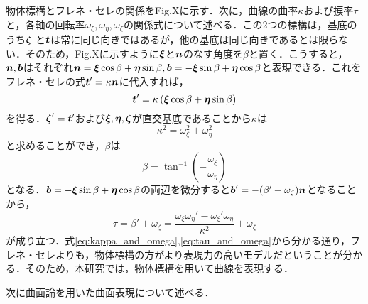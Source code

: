  	
 	物体標構とフレネ・セレの関係をFig.Xに示す．次に，曲線の曲率$ \kappa $および捩率$ \tau $と，各軸の回転率$ \omega_{\xi},\omega_{\eta},\omega_{\zeta} $の関係式について述べる．この2つの標構は，基底のうち$ \boldsymbol{\zeta}$ と$\boldsymbol{t} $は常に同じ向きではあるが，他の基底は同じ向きであるとは限らない．そのため，Fig.Xに示すように$ \boldsymbol{\xi} $と$ \boldsymbol{n} $のなす角度を$ \beta $と置く．こうすると，$ \boldsymbol{n},\boldsymbol{b}$はそれぞれ$ \boldsymbol{n} = \boldsymbol{\xi} \cos \beta + \boldsymbol{\eta} \sin \beta,\boldsymbol{b} = -\boldsymbol{\xi} \sin \beta + \boldsymbol{\eta} \cos \beta $と表現できる．これをフレネ・セレの式$ \boldsymbol{t}' = \kappa \boldsymbol{n} $に代入すれば，
 	\begin{equation}\label{eq:t_dot_eq}
 		\boldsymbol{t}' = \kappa \left( \boldsymbol{\xi} \cos \beta + \boldsymbol{\eta} \sin \beta \right)
 	\end{equation}
 	を得る．$ \boldsymbol{\zeta}' = \boldsymbol{t}' $および$ \boldsymbol{\xi},\boldsymbol{\eta},\boldsymbol{\zeta} $が直交基底であることから$ \kappa $は
 	\begin{equation}\label{eq:kappa_and_omega}
 		\kappa^2 = \omega_{\xi}^2 + \omega_{\eta}^2
 	\end{equation}
 	と求めることができ，$ \beta $は
 	\begin{equation}\label{eq:beta_and_omega}
 		\beta = \tan^{-1} \left( -\frac{\omega_{\xi}}{\omega_{\eta}} \right)
 	\end{equation}
 	となる．$ \boldsymbol{b} = -\boldsymbol{\xi} \sin \beta + \boldsymbol{\eta} \cos \beta$の両辺を微分すると$ \boldsymbol{b}' = -(\beta' + \omega_{\zeta})\boldsymbol{n} $となることから，
 	\begin{equation}\label{eq:tau_and_omega}
 		\tau = \beta' + \omega_{\zeta} = \frac{\omega_{\xi} \omega_{\eta}' - \omega_{\xi}' \omega_{\eta}}{\kappa^2} + \omega_{\zeta} 
 	\end{equation}
 	が成り立つ．式\ref{eq:kappa_and_omega},\ref{eq:tau_and_omega}から分かる通り，フレネ・セレよりも，物体標構の方がより表現力の高いモデルだということが分かる．そのため，本研究では，物体標構を用いて曲線を表現する．
 	
 	次に曲面論を用いた曲面表現について述べる．